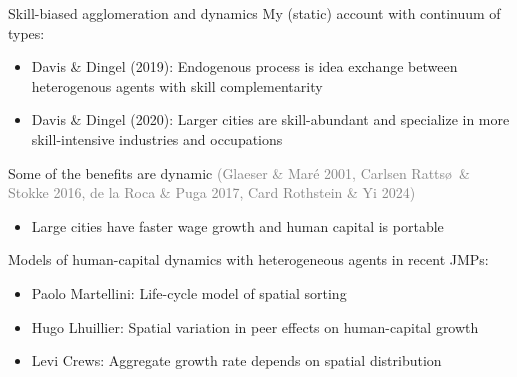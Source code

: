\documentclass[11pt,notes=hide,aspectratio=169]{beamer}
\begin{document}
\begin{frame}{Skill-biased agglomeration and dynamics}
My (static) account with continuum of types:
\begin{itemize}
\item Davis \& Dingel (2019):
Endogenous process is idea exchange between heterogenous agents with skill complementarity
\item Davis \& Dingel (2020):
Larger cities are skill-abundant and specialize in more skill-intensive industries and occupations
\end{itemize}
Some of the benefits are dynamic {\small \textcolor{gray}{(Glaeser \& Mar\'{e} 2001, Carlsen Ratts\o\ \& Stokke 2016, de la Roca \& Puga 2017, Card Rothstein \& Yi 2024)}}
\begin{itemize}
\item
Large cities have faster wage growth and human capital is portable
\end{itemize}
\smallskip
Models of human-capital dynamics with heterogeneous agents in recent JMPs:
\begin{itemize}
\item Paolo Martellini:
Life-cycle model of spatial sorting
\item Hugo Lhuillier:
Spatial variation in peer effects on human-capital growth
\item Levi Crews:
Aggregate growth rate depends on spatial distribution %
\end{itemize}
\end{frame}
\end{document}
